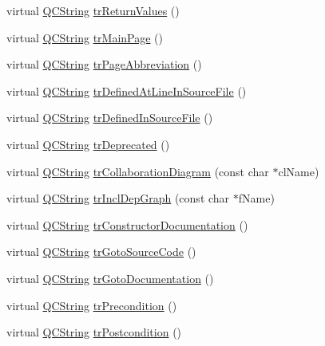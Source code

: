 \begin{DoxyCompactItemize}
\item 
virtual \hyperlink{class_q_c_string}{Q\+C\+String} \hyperlink{class_translator_chinesetraditional_a71d32839c4b744f25b05f0e4bdac450c}{tr\+Return\+Values} ()
\item 
virtual \hyperlink{class_q_c_string}{Q\+C\+String} \hyperlink{class_translator_chinesetraditional_a68f8441ce8bc3f508eac1586bb02e249}{tr\+Main\+Page} ()
\item 
virtual \hyperlink{class_q_c_string}{Q\+C\+String} \hyperlink{class_translator_chinesetraditional_a18084cdddd1baa4210092fc99e8f6438}{tr\+Page\+Abbreviation} ()
\item 
virtual \hyperlink{class_q_c_string}{Q\+C\+String} \hyperlink{class_translator_chinesetraditional_a9170f2a51e8d11640cea5c9be5d5cd2c}{tr\+Defined\+At\+Line\+In\+Source\+File} ()
\item 
virtual \hyperlink{class_q_c_string}{Q\+C\+String} \hyperlink{class_translator_chinesetraditional_ae690faa7b0a64472ce70b374b65b9694}{tr\+Defined\+In\+Source\+File} ()
\item 
virtual \hyperlink{class_q_c_string}{Q\+C\+String} \hyperlink{class_translator_chinesetraditional_aa63a520e54aa78724910fd1c6110f3be}{tr\+Deprecated} ()
\item 
virtual \hyperlink{class_q_c_string}{Q\+C\+String} \hyperlink{class_translator_chinesetraditional_a3339f96a2c8696dba9dfb553df59050e}{tr\+Collaboration\+Diagram} (const char $\ast$cl\+Name)
\item 
virtual \hyperlink{class_q_c_string}{Q\+C\+String} \hyperlink{class_translator_chinesetraditional_a040b175f68da5d4dc7efee16a08a634c}{tr\+Incl\+Dep\+Graph} (const char $\ast$f\+Name)
\item 
virtual \hyperlink{class_q_c_string}{Q\+C\+String} \hyperlink{class_translator_chinesetraditional_a2ceebe1beb156a83ed38af7690b732f4}{tr\+Constructor\+Documentation} ()
\item 
virtual \hyperlink{class_q_c_string}{Q\+C\+String} \hyperlink{class_translator_chinesetraditional_afe6478c12591ba06d7f8bc574e42e004}{tr\+Goto\+Source\+Code} ()
\item 
virtual \hyperlink{class_q_c_string}{Q\+C\+String} \hyperlink{class_translator_chinesetraditional_a6f3b8bb891c29f32a1453fc086352735}{tr\+Goto\+Documentation} ()
\item 
virtual \hyperlink{class_q_c_string}{Q\+C\+String} \hyperlink{class_translator_chinesetraditional_a938da32ab20e86e35800dc3782a87412}{tr\+Precondition} ()
\item 
virtual \hyperlink{class_q_c_string}{Q\+C\+String} \hyperlink{class_translator_chinesetraditional_a6d6cb27072cc8f39c0013e0d43f745ae}{tr\+Postcondition} ()

\end{DoxyCompactItemize}

